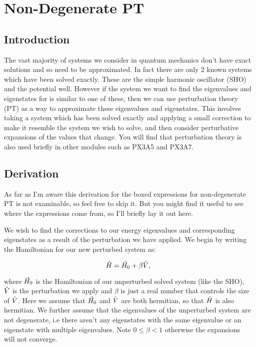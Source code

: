 \chapter{Non-Degenerate PT}
\label{chapt1}

\section{Introduction}

The vast majority of systems we consider in quantum mechanics don't have exact solutions and so need to be approximated. In fact there are only 2 known systems which have been solved exactly. These are the simple harmonic oscillator (SHO) and the potential well. However if the system we want to find the eigenvalues and eigenstates for is similar to one of these, then we can use perturbation theory (PT) as a way to approximate these eigenvalues and eigenstates. This involves taking a system which has been solved exactly and applying a small correction to make it resemble the system we wish to solve, and then consider perturbative expansions of the values that change. You will find that perturbation theory is also used briefly in other modules such as PX3A5 and PX3A7.

\section{Derivation}

\noindent As far as I'm aware this derivation for the boxed expressions for non-degenerate PT is not examinable, so feel free to skip it. But you might find it useful to see where the expressions come from, so I'll briefly lay it out here.

\noindent We wish to find the corrections to our energy eigenvalues and corresponding eigenstates as a result of the perturbation we have applied. We begin by writing the Hamiltonian for our new perturbed system as:

\begin{equation}
    \Hat{H} = \Hat{H_0} + \beta \Hat{V},
    \label{ModifidedHamiltonianPT}
\end{equation}

\noindent where $\Hat{H_0}$ is the Hamiltonian of our unperturbed solved system (like the SHO), $\Hat{V}$ is the perturbation we apply and $\beta$ is just a real number that controls the size of $\Hat{V}$. Here we assume that $\Hat{H_0}$ and $\Hat{V}$ are both hermitian, so that $\Hat{H}$ is also hermitian. We further assume that the eigenvalues of the unperturbed system are not degenerate, i.e there aren't any eigenstates with the same eigenvalue or an eigenstate with multiple eigenvalues. Note $0\leq \beta < 1$ otherwise the expansions will not converge.

